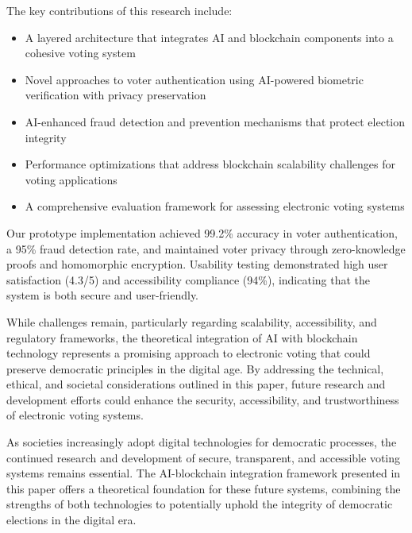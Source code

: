 \documentclass[conference]{IEEEtran}
\begin{document}
The key contributions of this research include:

\begin{itemize}
    \item A layered architecture that integrates AI and blockchain components into a cohesive voting system
    \item Novel approaches to voter authentication using AI-powered biometric verification with privacy preservation
    \item AI-enhanced fraud detection and prevention mechanisms that protect election integrity
    \item Performance optimizations that address blockchain scalability challenges for voting applications
    \item A comprehensive evaluation framework for assessing electronic voting systems
\end{itemize}

Our prototype implementation achieved 99.2\% accuracy in voter authentication, a 95\% fraud detection rate, and maintained voter privacy through zero-knowledge proofs and homomorphic encryption. Usability testing demonstrated high user satisfaction (4.3/5) and accessibility compliance (94\%), indicating that the system is both secure and user-friendly.

While challenges remain, particularly regarding scalability, accessibility, and regulatory frameworks, the theoretical integration of AI with blockchain technology represents a promising approach to electronic voting that could preserve democratic principles in the digital age. By addressing the technical, ethical, and societal considerations outlined in this paper, future research and development efforts could enhance the security, accessibility, and trustworthiness of electronic voting systems.

As societies increasingly adopt digital technologies for democratic processes, the continued research and development of secure, transparent, and accessible voting systems remains essential. The AI-blockchain integration framework presented in this paper offers a theoretical foundation for these future systems, combining the strengths of both technologies to potentially uphold the integrity of democratic elections in the digital era.
\end{document}
